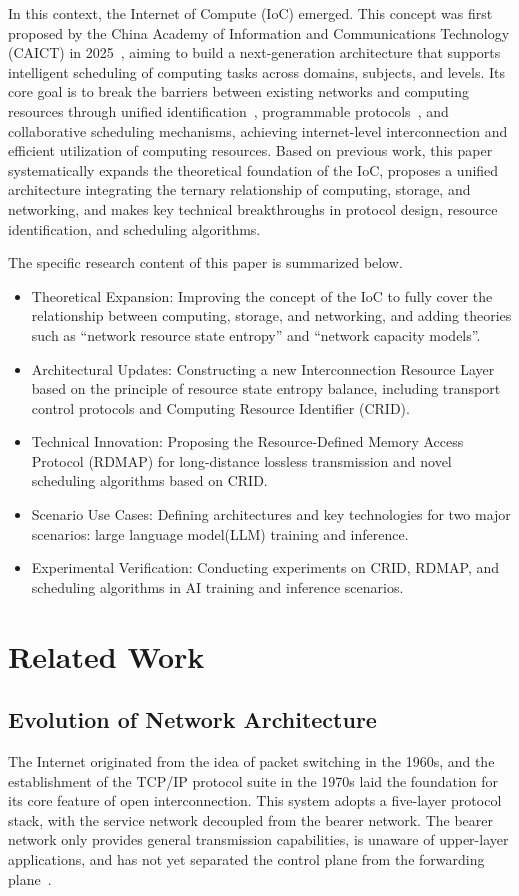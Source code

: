\documentclass{ccjnl}
\begin{document}
In this context, the Internet of Compute (IoC) emerged. This concept was first proposed by the China Academy of Information and Communications Technology (CAICT) in 2025~\cite{9}, aiming to build a next-generation architecture that supports intelligent scheduling of computing tasks across domains, subjects, and levels. Its core goal is to break the barriers between existing networks and computing resources through unified identification~\cite{10}, programmable protocols~\cite{31}, and collaborative scheduling mechanisms, achieving internet-level interconnection and efficient utilization of computing resources. Based on previous work, this paper systematically expands the theoretical foundation of the IoC, proposes a unified architecture integrating the ternary relationship of computing, storage, and networking, and makes key technical breakthroughs in protocol design, resource identification, and scheduling algorithms.

The specific research content of this paper is summarized below.
\begin{itemize}[nosep]
	\item Theoretical Expansion: Improving the concept of the IoC to fully cover the relationship between computing, storage, and networking, and adding theories such as “network resource state entropy” and “network capacity models”.
	\item Architectural Updates: Constructing a new Interconnection Resource Layer based on the principle of resource state entropy balance, including transport control protocols and Computing Resource Identifier (CRID).
	\item Technical Innovation: Proposing the Resource-Defined Memory Access Protocol (RDMAP) for long-distance lossless transmission and novel scheduling algorithms based on CRID.
	\item Scenario Use Cases: Defining architectures and key technologies for two major scenarios: large language model(LLM) training and inference.
	\item Experimental Verification: Conducting experiments on CRID, RDMAP, and scheduling algorithms in AI training and inference scenarios.
\end{itemize}

\section{Related Work}
\label{s2}

\subsection{Evolution of Network Architecture}
\label{s2-1}
The Internet originated from the idea of packet switching in the 1960s, and the establishment of the TCP/IP protocol suite in the 1970s laid the foundation for its core feature of open interconnection. This system adopts a five-layer protocol stack, with the service network decoupled from the bearer network. The bearer network only provides general transmission capabilities, is unaware of upper-layer applications, and has not yet separated the control plane from the forwarding plane~\cite{11}.
\end{document}
